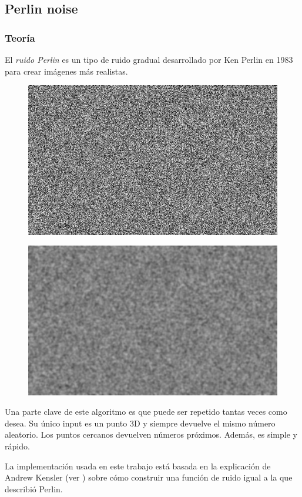 \documentclass[12pt]{article}
\theoremstyle{definition}
\theoremstyle{remark}
\begin{document}
\subsection{Perlin noise}

\subsubsection{Teoría}

El \textit{ruido Perlin} es un tipo de ruido gradual desarrollado por Ken Perlin en 1983 para crear imágenes más realistas.

\begin{figure}[H]
\centering
\begin{minipage}{.5\textwidth}
  \centering
  \includegraphics[width=.6\linewidth]{white-noise.jpg}
  \label{fig:test1}
\end{minipage}%
\begin{minipage}{.5\textwidth}
  \centering
  \includegraphics[width=.6\linewidth]{white-noise-blurred.jpg}
  \label{fig:test2}
\end{minipage}
\end{figure}

Una parte clave de este algoritmo es que puede ser repetido tantas veces como desea. Su único input es un punto 3D y siempre devuelve el mismo número aleatorio. Los puntos cercanos devuelven números próximos. Además, es simple y rápido.

La implementación usada en este trabajo está basada en la explicación de Andrew Kensler (ver \cite{perlinnoiseimplementation}) sobre cómo construir una función de ruido igual a la que describió Perlin.
\end{document}
